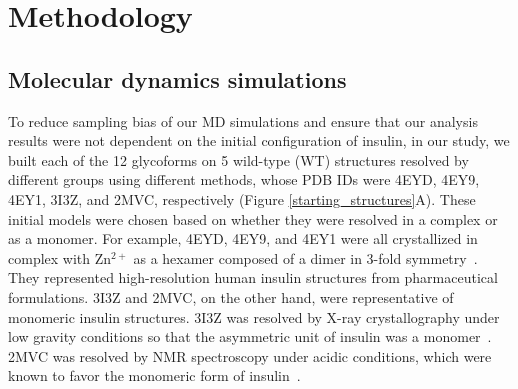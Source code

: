 \documentclass[9pt]{elife}
\begin{document}
    


\section{Methodology}
\subsection{Molecular dynamics simulations}

To reduce sampling bias of our MD simulations and ensure that our analysis results were not dependent on the initial configuration of insulin, in our study, we built each of the 12 glycoforms on 5 wild-type (WT) structures resolved by different groups using different methods, whose PDB IDs were 4EYD, 4EY9, 4EY1, 3I3Z, and 2MVC, respectively (Figure \ref{starting_structures}A). These initial models were chosen based on whether they were resolved in a complex or as a monomer. For example, 4EYD, 4EY9, and 4EY1 were all crystallized in complex with Zn$^{2+}$ as a hexamer composed of a dimer in 3-fold symmetry~\cite{favero2013structural}. They represented high-resolution human insulin structures from pharmaceutical formulations. 3I3Z and 2MVC, on the other hand, were representative of monomeric insulin structures. 3I3Z was resolved by X-ray crystallography under low gravity conditions so that the asymmetric unit of insulin was a monomer~\cite{timofeev2010x}. 2MVC was resolved by NMR spectroscopy under acidic conditions, which were known to favor the monomeric form of insulin~\cite{kvrivzkova2014structural}.
\end{document}
